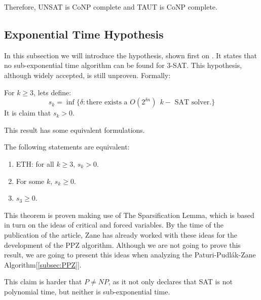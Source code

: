 Therefore, UNSAT is CoNP complete and TAUT is CoNP complete.

\subsection{Exponential Time Hypothesis}
\label{hyp:exponential_time}
In this subsection we will introduce the hypothesis, shown first on \cite{impagliazzo2001complexity}. It states that no sub-exponential time algorithm can be found for 3-SAT. This hypothesis, although widely accepted, is still unproven. Formally:

\begin{definition}[ETH]
  For $k\ge 3$, lets define:
  $$s_k=\inf\{\delta: \text{there exists a } O(2^{\delta n})\ \ k-\text{ SAT solver.}\}$$
  It is claim that $s_k>0$.
\end{definition}

This result has some equivalent formulations.

\begin{proposition}
  The following statements are equivalent:
  \begin{enumerate}
  \item ETH: for all $k\ge 3$, $s_k > 0$.
  \item For some $k$, $s_k \ge 0$.
  \item $s_3 \ge 0$.

  \end{enumerate}
  \end{proposition}

This theorem is proven making use of The Sparsification Lemma, which is based in turn on the ideas of critical and forced variables. By the time of the publication of the article, Zane has already worked with these ideas for the development of the PPZ algorithm\cite{paturi1997satisfiability}. Although we are not going to prove this result, we are going to present this ideas when analyzing the Paturi-Pudlák-Zane Algorithm[\ref{subsec:PPZ}].
 
This claim is harder that $P\ne NP$, as it not only declares that SAT is not polynomial time, but neither is sub-exponential time. 







